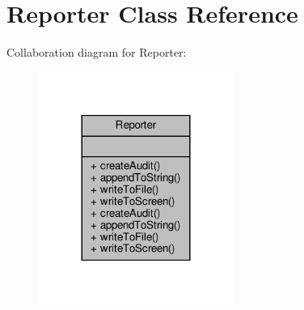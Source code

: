 \hypertarget{classReporter}{}\section{Reporter Class Reference}
\label{classReporter}


Collaboration diagram for Reporter\+:\nopagebreak
\begin{figure}[H]
\begin{center}
\leavevmode
\includegraphics[width=180pt]{classReporter__coll__graph}
\end{center}
\end{figure}

